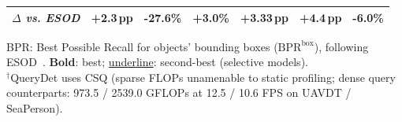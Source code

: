 \begin{table}[t]
\begin{tabular*}{\columnwidth}{@{\extracolsep{\fill}}lcccccc@{}}
\textit{$\Delta$ vs. ESOD} & \textbf{+2.3\,pp} & \textbf{-27.6\%} & +3.0\% & \textbf{+3.33\,pp} & \textbf{+4.4\,pp} & -6.0\% \\
\bottomrule
\end{tabular*}
\vspace{0.4mm}
\parbox{\columnwidth}{\scriptsize BPR: Best Possible Recall for objects' bounding boxes ($\mathrm{BPR}^{\mathrm{box}}$), following ESOD~\cite{ESOD}. \textbf{Bold}: best; \underline{underline}: second-best (selective models).\\
$^\dagger$QueryDet uses CSQ (sparse FLOPs unamenable to static profiling; dense query counterparts: 973.5 / 2539.0 GFLOPs at 12.5 / 10.6 FPS on UAVDT / SeaPerson).}
\vspace{0.5mm}
\end{table}

